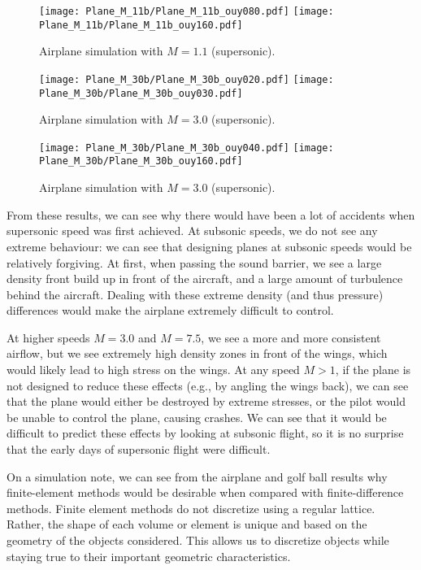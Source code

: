 \documentclass[twocolumn]{myarticle}
\numberwithin{equation}{section}
\begin{document}
\begin{figure*}[ht]
    \centering
    \texttt{[image: Plane\_M\_11b/Plane\_M\_11b\_ouy080.pdf]}
    \texttt{[image: Plane\_M\_11b/Plane\_M\_11b\_ouy160.pdf]}
    \caption{Airplane simulation with $ M = 1.1 $ (supersonic).}
    \label{fig:plane5b}
\end{figure*}


\begin{figure*}[ht]
    \centering
    \texttt{[image: Plane\_M\_30b/Plane\_M\_30b\_ouy020.pdf]}
    \texttt{[image: Plane\_M\_30b/Plane\_M\_30b\_ouy030.pdf]}
    \caption{Airplane simulation with $ M = 3.0 $ (supersonic).}
    \label{fig:plane6a}
\end{figure*}

\begin{figure*}[ht]
    \centering
    \texttt{[image: Plane\_M\_30b/Plane\_M\_30b\_ouy040.pdf]}
    \texttt{[image: Plane\_M\_30b/Plane\_M\_30b\_ouy160.pdf]}
    \caption{Airplane simulation with $ M = 3.0 $ (supersonic).}
    \label{fig:plane6b}
\end{figure*}

From these results, we can see why there would have been a lot of accidents when supersonic speed was first achieved.
At subsonic speeds, we do not see any extreme behaviour: we can see that designing planes at subsonic speeds would be relatively forgiving.
At first, when passing the sound barrier, we see a large density front build up in front of the aircraft, and a large amount of turbulence behind the aircraft.
Dealing with these extreme density (and thus pressure) differences would make the airplane extremely difficult to control.

At higher speeds $ M = 3.0 $ and $ M = 7.5 $, we see a more and more consistent airflow, but we see extremely high density zones in front of the wings, which would likely lead to high stress on the wings.
At any speed $ M > 1 $, if the plane is not designed to reduce these effects (e.g., by angling the wings back), we can see that the plane would either be destroyed by extreme stresses, or the pilot would be unable to control the plane, causing crashes.
We can see that it would be difficult to predict these effects by looking at subsonic flight, so it is no surprise that the early days of supersonic flight were difficult.

On a simulation note, we can see from the airplane and golf ball results why finite-element methods would be desirable when compared with finite-difference methods.
Finite element methods do not discretize using a regular lattice.
Rather, the shape of each volume or element is unique and based on the geometry of the objects considered.
This allows us to discretize objects while staying true to their important geometric characteristics.
\end{document}
